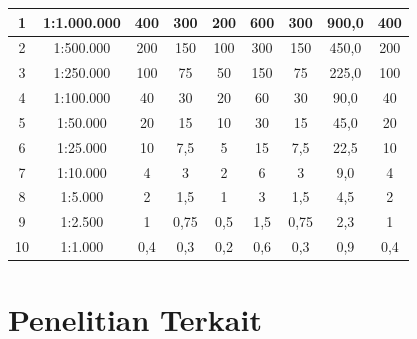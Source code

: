 \begin{table}[h]
{\begin{tabular}{|c|c|c|c|c|c|c|c|c|}
\hline
1 & 1:1.000.000 & 400 & 300 & 200 & 600 & 300 & 900,0 & 400 \\
\hline
2 & 1:500.000 & 200 & 150 & 100 & 300 & 150 & 450,0 & 200 \\
\hline
3 & 1:250.000 & 100 & 75 & 50 & 150 & 75 & 225,0 & 100 \\
\hline
4 & 1:100.000 & 40 & 30 & 20 & 60 & 30 & 90,0 & 40 \\
\hline
5 & 1:50.000 & 20 & 15 & 10 & 30 & 15 & 45,0 & 20 \\
\hline
6 & 1:25.000 & 10 & 7,5 & 5 & 15 & 7,5 & 22,5 & 10 \\
\hline
7 & 1:10.000 & 4 & 3 & 2 & 6 & 3 & 9,0 & 4 \\
\hline
8 & 1:5.000 & 2 & 1,5 & 1 & 3 & 1,5 & 4,5 & 2 \\
\hline
9 & 1:2.500 & 1 & 0,75 & 0,5 & 1,5 & 0,75 & 2,3 & 1 \\
\hline
10 & 1:1.000 & 0,4 & 0,3 & 0,2 & 0,6 & 0,3 & 0,9 & 0,4 \\
\hline
\end{tabular}
}
\end{table}

    






\section{Penelitian Terkait}


